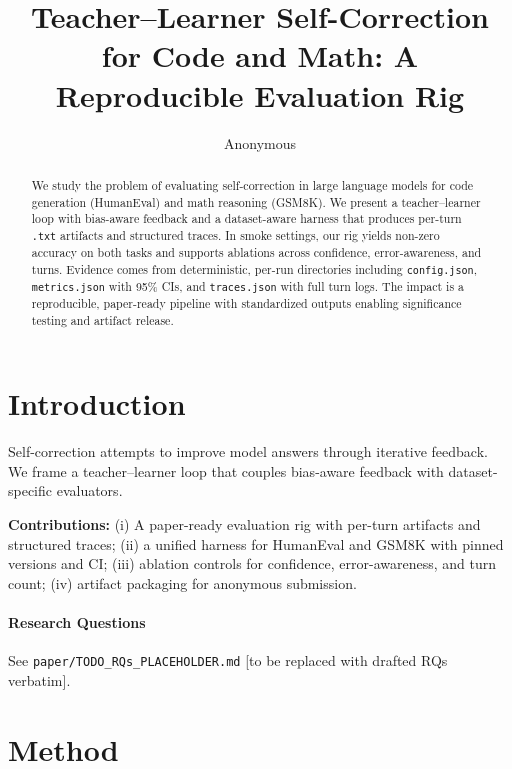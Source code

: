 \documentclass[11pt]{article}
\title{Teacher--Learner Self-Correction for Code and Math: A Reproducible Evaluation Rig}
\author{Anonymous}
\date{}
\begin{document}
\maketitle

\begin{abstract}
We study the problem of evaluating self-correction in large language models for code generation (HumanEval) and math reasoning (GSM8K). We present a teacher--learner loop with bias-aware feedback and a dataset-aware harness that produces per-turn \texttt{.txt} artifacts and structured traces. In smoke settings, our rig yields non-zero accuracy on both tasks and supports ablations across confidence, error-awareness, and turns. Evidence comes from deterministic, per-run directories including \texttt{config.json}, \texttt{metrics.json} with 95\% CIs, and \texttt{traces.json} with full turn logs. The impact is a reproducible, paper-ready pipeline with standardized outputs enabling significance testing and artifact release.
\end{abstract}

\section{Introduction}
Self-correction attempts to improve model answers through iterative feedback. We frame a teacher--learner loop that couples bias-aware feedback with dataset-specific evaluators.

\noindent\textbf{Contributions:} (i) A paper-ready evaluation rig with per-turn artifacts and structured traces; (ii) a unified harness for HumanEval and GSM8K with pinned versions and CI; (iii) ablation controls for confidence, error-awareness, and turn count; (iv) artifact packaging for anonymous submission.

\paragraph{Research Questions} See \texttt{paper/TODO\_RQs\_PLACEHOLDER.md} [to be replaced with drafted RQs verbatim].

\section{Method}
\end{document}
